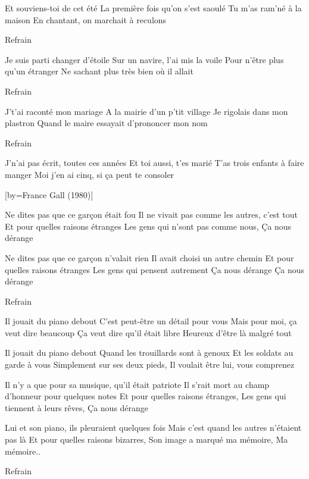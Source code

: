 \beginverse
Et souviens-toi de cet été
La première fois qu'on s'est saoulé
Tu m'as ram'né à la maison
En chantant, on marchait à reculons
\endverse

\beginverse
Refrain
\endverse

\beginverse
Je suis parti changer d'étoile
Sur un navire, l'ai mis la voile
Pour n'être plus qu'un étranger
Ne sachant plus très bien où il allait
\endverse

\beginverse
Refrain
\endverse

\beginverse
J't'ai raconté mon mariage
A la mairie d'un p'tit village
Je rigolais dans mon plastron
Quand le maire essayait d'prononcer mon nom
\endverse

\beginverse
Refrain
\endverse

\beginverse
J'n'ai pas écrit, toutes ces années
Et toi aussi, t'es marié
T'as trois enfants à faire manger
Moi j'en ai cinq, si ça peut te consoler
\endverse

[by={France Gall (1980)}]

\beginverse
Ne dites pas que ce garçon était fou
Il ne vivait pas comme les autres, c'est tout
Et pour quelles raisons étranges
Les gens qui n'sont pas comme nous,
Ça nous dérange
\endverse

\beginverse
Ne dites pas que ce garçon n'valait rien
Il avait choisi un autre chemin
Et pour quelles raisons étranges
Les gens qui pensent autrement
Ça nous dérange
Ça nous dérange
\endverse

\beginverse
Refrain
\endverse

\beginverse
Il jouait du piano debout
C'est peut-être un détail pour vous
Mais pour moi, ça veut dire beaucoup
Ça veut dire qu'il était libre
Heureux d'être là malgré tout
\endverse

\beginverse
Il jouait du piano debout
Quand les trouillards sont à genoux
Et les soldats au garde à vous
Simplement sur ses deux pieds,
Il voulait être lui, vous comprenez
\endverse

\beginverse
Il n'y a que pour sa musique, qu'il était patriote
Il s'rait mort au champ d'honneur pour quelques notes
Et pour quelles raisons étranges,
Les gens qui tiennent à leurs rêves,
Ça nous dérange
\endverse

\beginverse
Lui et son piano, ils pleuraient quelques fois
Mais c'est quand les autres n'étaient pas là
Et pour quelles raisons bizarres,
Son image a marqué ma mémoire,
Ma mémoire..
\endverse

\beginverse
Refrain
\endverse


